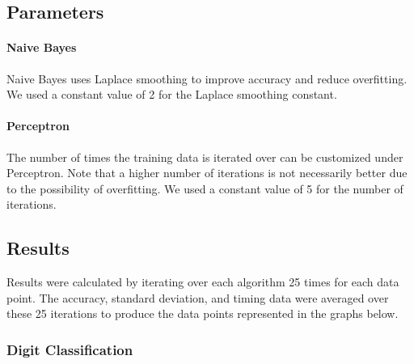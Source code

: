 \documentclass{article}
\begin{document}
  \subsection{Parameters}
  \paragraph{Naive Bayes}
  Naive Bayes uses Laplace smoothing to improve accuracy and reduce overfitting. We used a constant value of 2 for the Laplace smoothing constant.
  \paragraph{Perceptron}
  The number of times the training data is iterated over can be customized under Perceptron. 
  Note that a higher number of iterations is not necessarily better due to the possibility of overfitting.
  We used a constant value of 5 for the number of iterations.
  \subsection{Results}
  Results were calculated by iterating over each algorithm 25 times for each data point.
  The accuracy, standard deviation, and timing data were averaged over these 25 iterations to produce the data points represented in the graphs below.
  \subsubsection{Digit Classification}
\end{document}
